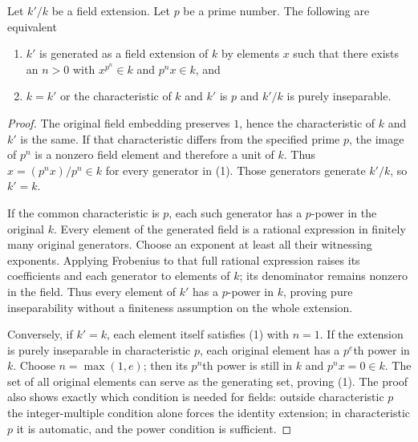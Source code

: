 \begin{lemma}
\label{lemma-p-ring-map-field}
Let $k'/k$ be a field extension. Let $p$ be a prime number.
The following are equivalent
\begin{enumerate}
\item $k'$ is generated as a field extension of $k$ by elements
$x$ such that there exists an $n > 0$ with $x^{p^n} \in k$ and
$p^nx \in k$, and
\item $k = k'$ or the characteristic of $k$
and $k'$ is $p$ and $k'/k$ is purely inseparable.
\end{enumerate}
\end{lemma}

\begin{proof}
The original field embedding preserves $1$, hence
the characteristic of $k$ and $k'$ is the
same. If that characteristic differs from
the specified prime $p$, the image of
$p^n$ is a nonzero field element and
therefore a unit of $k$. Thus
$x=(p^n x)/p^n\in k$ for every generator
in (1). Those generators generate $k'/k$,
so $k'=k$.

If the common characteristic is $p$,
each such generator has a $p$-power
in the original $k$. Every element
of the generated field is a rational
expression in finitely many original
generators. Choose an exponent at
least all their witnessing exponents.
Applying Frobenius to that full
rational expression raises its
coefficients and each generator to
elements of $k$; its denominator
remains nonzero in the field.
Thus every element of $k'$ has a
$p$-power in $k$, proving pure
inseparability without a finiteness
assumption on the whole extension.

Conversely, if $k'=k$, each element
itself satisfies (1) with $n=1$.
If the extension is purely
inseparable in characteristic $p$,
each original element has a
$p^e$th power in $k$. Choose
$n=\max(1,e)$; then its $p^n$th
power is still in $k$ and
$p^n x=0\in k$. The set of all
original elements can serve as
the generating set, proving (1).
The proof also shows exactly
which condition is needed for
fields: outside characteristic
$p$ the integer-multiple condition
alone forces the identity extension;
in characteristic $p$ it is automatic,
and the power condition is sufficient.
\end{proof}